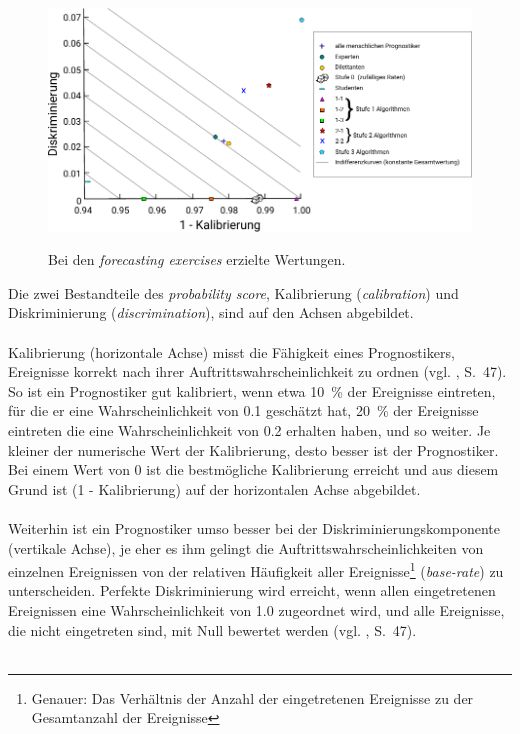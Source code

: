 \begin{figure}%
\centering
\caption{Bei den \emph{forecasting exercises} erzielte Wertungen.}
\includegraphics[scale=1.0]{Grafiken/Tetlock_1_Fertig_Ink.pdf} 
\label{pic:Tetlock_1}
\end{figure}
\label{Kal_Dis}
Die zwei
Bestandteile des \emph{probability score}, Kalibrierung (\emph{calibration}) und
Diskriminierung (\emph{discrimination}), sind auf den Achsen abgebildet. \\ \\ 
Kalibrierung (horizontale Achse) misst die Fähigkeit eines Prognostikers,
Ereignisse korrekt nach ihrer
Auftrittswahrscheinlichkeit zu ordnen (vgl. \cite{Tetlock}, S.~47). So ist ein
Prognostiker gut kalibriert, wenn etwa 10~\% der Ereignisse eintreten, für die
er eine Wahrscheinlichkeit von 0.1 geschätzt hat, 20~\% der Ereignisse eintreten
die eine Wahrscheinlichkeit von 0.2 erhalten haben, und so weiter. Je kleiner
der numerische Wert der Kalibrierung, desto besser ist der Prognostiker. Bei
einem Wert von 0 ist die bestmögliche Kalibrierung erreicht und aus diesem Grund
ist (1 - Kalibrierung) auf der horizontalen Achse abgebildet. \\ \\
Weiterhin ist ein Prognostiker umso besser bei der Diskriminierungskomponente
(vertikale Achse),
je eher es ihm gelingt die Auftrittswahrscheinlichkeiten von einzelnen
Ereignissen von der relativen Häufigkeit aller Ereignisse\footnote{
Genauer: Das Verhältnis der Anzahl der eingetretenen Ereignisse zu der
Gesamtanzahl der Ereignisse} (\emph{base-rate})
zu unterscheiden. Perfekte Diskriminierung wird erreicht, wenn allen 
eingetretenen Ereignissen eine Wahrscheinlichkeit von 1.0 zugeordnet wird, und
alle Ereignisse, die nicht eingetreten sind, mit Null bewertet werden
(vgl. \cite{Tetlock}, S.~47).\\ \\
